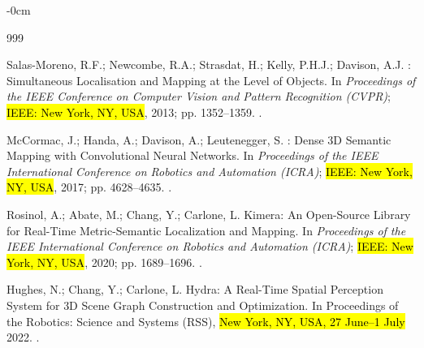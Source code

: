 \documentclass[electronics,article,accept,pdftex,moreauthors]{Definitions/mdpi}
\begin{document}
\begin{adjustwidth}{-\extralength}{0cm}


\begin{thebibliography}{999}

Salas-Moreno, R.F.; Newcombe, R.A.; Strasdat, H.; Kelly, P.H.J.; Davison, A.J.
: Simultaneous Localisation and Mapping at the Level of
  Objects.
\newblock In \textit{Proceedings of the IEEE Conference on Computer Vision and Pattern
  Recognition (CVPR)}; \hl{IEEE: New York, NY, USA},  2013; pp. 1352--1359.
. %

McCormac, J.; Handa, A.; Davison, A.; Leutenegger, S.
: Dense {3D} Semantic Mapping with Convolutional
  Neural Networks.
\newblock In \textit{Proceedings of the IEEE International Conference on Robotics and Automation
  (ICRA)}; \hl{IEEE: New York, NY, USA},  2017; pp. 4628--4635.
.

Rosinol, A.; Abate, M.; Chang, Y.; Carlone, L.
\newblock Kimera: An Open-Source Library for Real-Time Metric-Semantic
  Localization and Mapping.
\newblock In \textit{Proceedings of the IEEE International Conference on Robotics and Automation
  (ICRA)}; \hl{IEEE: New York, NY, USA},  2020; pp. 1689--1696.
.

Hughes, N.; Chang, Y.; Carlone, L.
\newblock Hydra: A Real-Time Spatial Perception System for {3D} Scene Graph
  Construction and Optimization.
\newblock In Proceedings of the Robotics: Science and Systems (RSS), \hl{New York, NY, USA,  27 June--1 July} 2022.
.


\end{thebibliography}
\end{adjustwidth}
\end{document}
